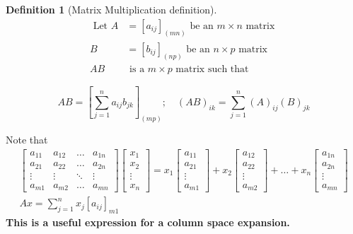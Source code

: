 \documentclass[twoside]{amsart}
\theoremstyle{plain}
\theoremstyle{definition}
\newtheorem{definition}{Definition}
\begin{document}
\begin{definition}[Matrix Multiplication definition]\label{D:matrix_multiplication}
  \begin{align*}
    \mbox{ Let } A & = [a_{ij}]_{(mn)} \mbox{ be an $m \times n $ matrix } \\
    B & = [b_{ij}]_{(np)} \mbox{ be an $n\times p$ matrix }\\
    AB & \mbox{ is a $m\times p $ matrix such that }
  \end{align*}

\begin{equation}
\boxed{ AB = \left[ \sum_{j=1}^n a_{ij} b_{jk}  \right]_{(mp)} ; \quad (AB)_{ik} = \sum_{j=1}^n (A)_{ij}(B)_{jk} }
\end{equation}

Note that 
\begin{gather*}
\left[ 
  \begin{matrix}
a_{11} & a_{12} & \dots & a_{1n} \\ 
a_{21} & a_{22} & \dots & a_{2n} \\
\vdots & \vdots & \ddots & \vdots \\
a_{m1} & a_{m2} & \dots & a_{mn} 
    \end{matrix}
   \right] \left[ 
\begin{matrix}
x_{1} \\ x_{2} \\ \vdots \\ x_n 
\end{matrix}
\right]
 = x_1  \left[ \begin{matrix} a_{11} \\ a_{21} \\ \vdots \\ a_{m1} \end{matrix}  \right] + x_2 \left[ \begin{matrix} a_{12} \\ a_{22} \\ \vdots \\ a_{m2} \end{matrix} \right] + \dots + x_n \left[ \begin{matrix} a_{1n} \\ a_{2n} \\ \vdots \\ a_{mn} \end{matrix}  \right] \\
Ax = \sum_{j=1}^n x_j [a_{ij}]_{m1}
\end{gather*}
\textbf{This is a useful expression for a column space expansion.  }

\end{definition}
\end{document}
